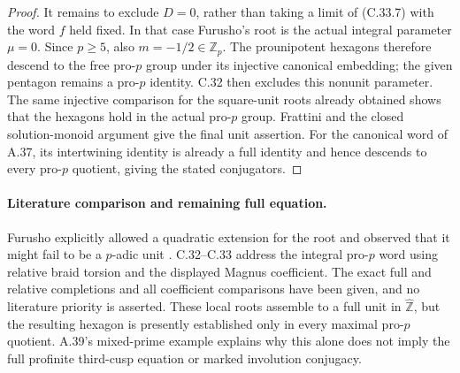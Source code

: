 \documentclass[11pt]{article}
\begin{document}
\begin{proof}
It remains to exclude $D=0$, rather than taking a limit of
(C.33.7) with the word $f$ held fixed. In that case Furusho's
root is the actual integral parameter $\mu=0$. Since $p\geq5$,
also $m=-1/2\in\mathbb Z_p$. The prounipotent hexagons therefore
descend to the free pro-$p$ group under its injective canonical
embedding; the given pentagon remains a pro-$p$ identity.
C.32 then excludes this nonunit parameter. The same injective
comparison for the square-unit roots already obtained shows that
the hexagons hold in the actual pro-$p$ group. Frattini and the
closed solution-monoid argument give the final unit assertion.
For the canonical word of A.37, its intertwining identity is
already a full identity and hence descends to every pro-$p$
quotient, giving the stated conjugators.
\end{proof}

\paragraph{Literature comparison and remaining full equation.}
Furusho explicitly allowed a quadratic extension for the root and
observed that it might fail to be a $p$-adic unit
\cite[paragraph following Corollary 13]{Furusho2010}.
C.32--C.33 address the integral pro-$p$ word using relative braid
torsion and the displayed Magnus coefficient. The exact full and
relative completions and all coefficient comparisons have been
given, and no literature priority is asserted. These local roots
assemble to a full unit in $\widehat{\mathbb Z}$, but the resulting
hexagon is presently established only in every maximal pro-$p$
quotient. A.39's mixed-prime example explains why this alone does
not imply the full profinite third-cusp equation or marked
involution conjugacy.
\end{document}
